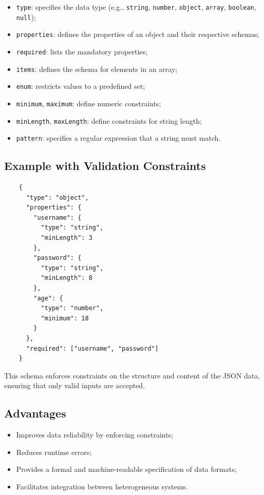 \documentclass{scrbook}
\begin{document}
	\begin{itemize}
		\item \texttt{type}: specifies the data type (e.g., \texttt{string}, \texttt{number}, \texttt{object}, \texttt{array}, \texttt{boolean}, \texttt{null});
		
		\item \texttt{properties}: defines the properties of an object and their respective schemas;
		
		\item \texttt{required}: lists the mandatory properties;
		
		\item \texttt{items}: defines the schema for elements in an array;
		
		\item \texttt{enum}: restricts values to a predefined set;
		
		\item \texttt{minimum}, \texttt{maximum}: define numeric constraints;
		
		\item \texttt{minLength}, \texttt{maxLength}: define constraints for string length;
		
		\item \texttt{pattern}: specifies a regular expression that a string must match.
	\end{itemize}
	
	\subsection{Example with Validation Constraints}
	
	\begin{lstlisting}
	{
	  "type": "object",
	  "properties": {
		"username": {
		  "type": "string",
		  "minLength": 3
		},
		"password": {
		  "type": "string",
		  "minLength": 8
		},
		"age": {
		  "type": "number",
		  "minimum": 18
		}
	  },
	  "required": ["username", "password"]
	}
	\end{lstlisting}
	
	This schema enforces constraints on the structure and content of the JSON data, ensuring that only valid inputs are accepted.
	
	\subsection{Advantages}
	
	\begin{itemize}
		\item Improves data reliability by enforcing constraints;
		\item Reduces runtime errors;
		\item Provides a formal and machine-readable specification of data formats;
		\item Facilitates integration between heterogeneous systems.
	\end{itemize}
	
\end{document}
